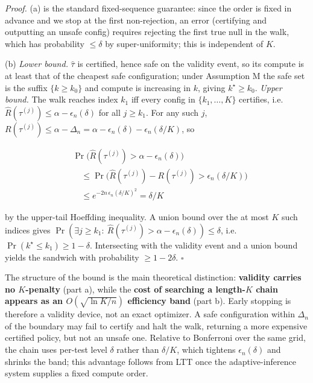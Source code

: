 \documentclass{ieeeaccess}
\begin{document}
\emph{Proof.} (a) is the standard fixed-sequence guarantee: since the order is fixed in advance and we stop at the first non-rejection, an error (certifying and outputting an unsafe config) requires rejecting the first true null in the walk, which has probability $\le\delta$ by super-uniformity; this is independent of $K$.

(b) \emph{Lower bound.} $\hat\tau$ is certified, hence safe on the validity event, so its compute is at least that of the cheapest safe configuration; under Assumption M the safe set is the suffix $\{k\ge k_0\}$ and compute is increasing in $k$, giving $k^\star\ge k_0$. \emph{Upper bound.} The walk reaches index $k_1$ iff every config in $\{k_1,\dots,K\}$ certifies, i.e. $\hat R(\tau^{(j)})\le\alpha-\epsilon_n(\delta)$ for all $j\ge k_1$. For any such $j$, $R(\tau^{(j)})\le\alpha-\Delta_n=\alpha-\epsilon_n(\delta)-\epsilon_n(\delta/K)$, so

\[
\begin{aligned}
&\Pr\big(\hat R(\tau^{(j)})>\alpha-\epsilon_n(\delta)\big)\\
&\quad\le
\Pr\big(\hat R(\tau^{(j)})-R(\tau^{(j)})
  >\epsilon_n(\delta/K)\big)\\
&\quad\le e^{-2n\,\epsilon_n(\delta/K)^2}=\delta/K
\end{aligned}
\]

by the upper-tail Hoeffding inequality. A union bound over the at most $K$ such indices gives $\Pr(\exists j\ge k_1:\ \hat R(\tau^{(j)})>\alpha-\epsilon_n(\delta))\le\delta$, i.e. $\Pr(k^\star\le k_1)\ge1-\delta$. Intersecting with the validity event and a union bound yields the sandwich with probability $\ge1-2\delta$. $\square$

The structure of the bound is the main theoretical distinction: \textbf{validity carries no $K$-penalty} (part a), while the \textbf{cost of searching a length-$K$ chain appears as an $O(\sqrt{\ln K/n})$ efficiency band} (part b). Early stopping is therefore a validity device, not an exact optimizer. A safe configuration within $\Delta_n$ of the boundary may fail to certify and halt the walk, returning a more expensive certified policy, but not an unsafe one. Relative to Bonferroni over the same grid, the chain uses per-test level $\delta$ rather than $\delta/K$, which tightens $\epsilon_n(\delta)$ and shrinks the band; this advantage follows from LTT once the adaptive-inference system supplies a fixed compute order.
\end{document}
